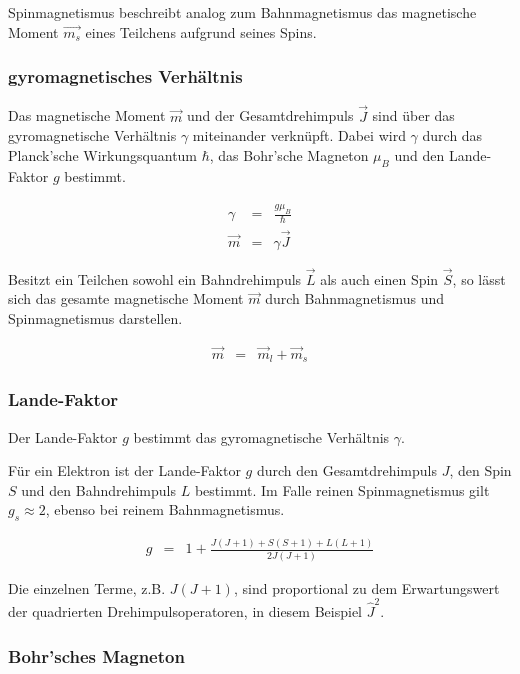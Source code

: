 \documentclass[12pt,a4paper]{scrartcl}
\numberwithin{equation}{section} %
\begin{document}
Spinmagnetismus beschreibt analog zum Bahnmagnetismus das magnetische
Moment $\vec{m_{s}}$ eines Teilchens aufgrund seines Spins.

\hypertarget{gyromagnetisches-verhuxe4ltnis}{%
\subsubsection{gyromagnetisches
Verhältnis}\label{gyromagnetisches-verhuxe4ltnis}}

Das magnetische Moment $\vec{m}$ und der Gesamtdrehimpuls $\vec{J}$
sind über das gyromagnetische Verhältnis $\gamma$ miteinander
verknüpft. Dabei wird $\gamma$ durch das Planck'sche Wirkungsquantum
$\hbar$, das Bohr'sche Magneton $\mu_{B}$ und den Lande-Faktor $g$
bestimmt.

\begin{eqnarray}
    \gamma &=& \frac{g\mu_B}{\hbar} \\
    \vec{m} &=& \gamma \vec{J}
\end{eqnarray}

Besitzt ein Teilchen sowohl ein Bahndrehimpuls $\vec L$ als auch einen
Spin $\vec S$, so lässt sich das gesamte magnetische Moment
$\vec{m}$ durch Bahnmagnetismus und Spinmagnetismus darstellen.

\begin{eqnarray}
    \vec m &=& \vec m_l + \vec m_s
\end{eqnarray}

\hypertarget{lande-faktor}{%
\subsubsection{Lande-Faktor}\label{lande-faktor}}

Der Lande-Faktor $g$ bestimmt das gyromagnetische Verhältnis
$\gamma$.

Für ein Elektron ist der Lande-Faktor $g$ durch den Gesamtdrehimpuls
$J$, den Spin $S$ und den Bahndrehimpuls $L$ bestimmt. Im Falle
reinen Spinmagnetismus gilt $g_{s} \approx 2$, ebenso bei reinem
Bahnmagnetismus.

\begin{eqnarray}
    g &=& 1 + \frac{J(J+1) + S(S+1) + L(L+1)}{2J(J+1)}
\end{eqnarray}

Die einzelnen Terme, z.B. $J(J+1)$, sind proportional zu dem
Erwartungswert der quadrierten Drehimpulsoperatoren, in diesem Beispiel
$\hat J^2$.

\hypertarget{bohrsches-magneton}{%
\subsubsection{Bohr'sches Magneton}\label{bohrsches-magneton}}
\end{document}
